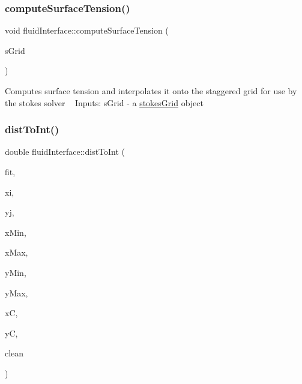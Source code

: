 \subsubsection{\texorpdfstring{compute\+Surface\+Tension()}{computeSurfaceTension()}\hspace{0.1cm}{\footnotesize\ttfamily [2/2]}}
{\footnotesize\ttfamily void fluid\+Interface\+::compute\+Surface\+Tension (\begin{DoxyParamCaption}\item[{\hyperlink{classstokesGrid}{stokes\+Grid} $\ast$}]{s\+Grid }\end{DoxyParamCaption})}

Computes surface tension and interpolates it onto the staggered grid for use by the stokes solver ~\newline
Inputs\+: s\+Grid -\/ a \hyperlink{classstokesGrid}{stokes\+Grid} object ~\newline
\mbox{\label{classfluidInterface_a83e14fb63e907f03973abb5124c87dfa}} 
\subsubsection{\texorpdfstring{dist\+To\+Int()}{distToInt()}}
{\footnotesize\ttfamily double fluid\+Interface\+::dist\+To\+Int (\begin{DoxyParamCaption}\item[{levelset\+::\+Bicubic $\ast$}]{fit,  }\item[{const double}]{xi,  }\item[{const double}]{yj,  }\item[{const double}]{x\+Min,  }\item[{const double}]{x\+Max,  }\item[{const double}]{y\+Min,  }\item[{const double}]{y\+Max,  }\item[{double \&}]{xC,  }\item[{double \&}]{yC,  }\item[{bool \&}]{clean }\end{DoxyParamCaption})}

